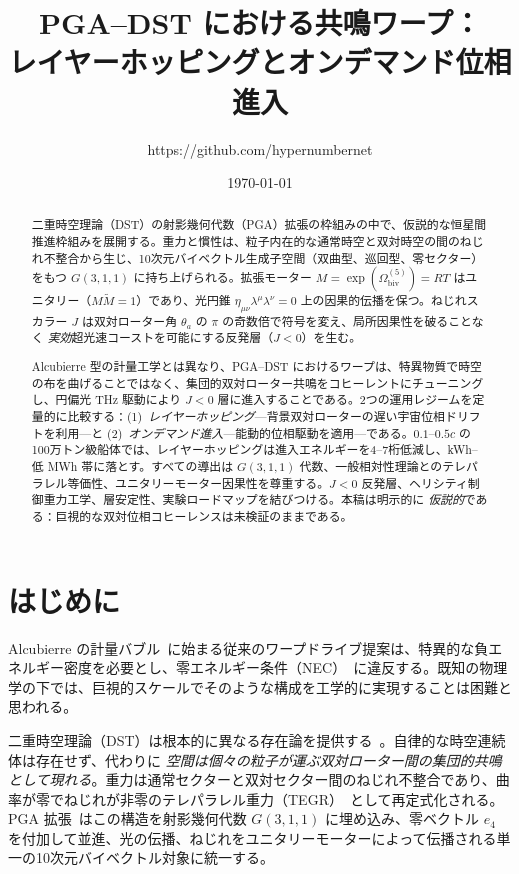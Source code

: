 \documentclass[dvipdfmx,a4paper]{article}
\title{PGA--DST における共鳴ワープ：\\
レイヤーホッピングとオンデマンド位相進入}
\author{https://github.com/hypernumbernet}
\date{\today}
\theoremstyle{definition}
\begin{document}
\maketitle

\begin{abstract}
二重時空理論（DST）の射影幾何代数（PGA）拡張の枠組みの中で、仮説的な恒星間推進枠組みを展開する。重力と慣性は、粒子内在的な通常時空と双対時空の間のねじれ不整合から生じ、10次元バイベクトル生成子空間（双曲型、巡回型、零セクター）をもつ $G(3,1,1)$ に持ち上げられる。拡張モーター $M=\exp(\Omega_{\mathrm{biv}}^{(5)})=RT$ はユニタリー（$M\widetilde{M}=1$）であり、光円錐 $\eta_{\mu\nu}\lambda^\mu\lambda^\nu=0$ 上の因果的伝播を保つ。ねじれスカラー $J$ は双対ローター角 $\theta_a$ の $\pi$ の奇数倍で符号を変え、局所因果性を破ることなく \emph{実効}超光速コーストを可能にする反発層（$J<0$）を生む。

Alcubierre 型の計量工学とは異なり、PGA--DST におけるワープは、特異物質で時空の布を曲げることではなく、集団的双対ローター共鳴をコヒーレントにチューニングし、円偏光 THz 駆動により $J<0$ 層に進入することである。2つの運用レジームを定量的に比較する：(1)~\textit{レイヤーホッピング}---背景双対ローターの遅い宇宙位相ドリフトを利用---と (2)~\textit{オンデマンド進入}---能動的位相駆動を適用---である。$0.1$--$0.5c$ の100万トン級船体では、レイヤーホッピングは進入エネルギーを4--7桁低減し、\si{kWh}--低 \si{MWh} 帯に落とす。すべての導出は $G(3,1,1)$ 代数、一般相対性理論とのテレパラレル等価性、ユニタリーモーター因果性を尊重する。$J<0$ 反発層、ヘリシティ制御重力工学、層安定性、実験ロードマップを結びつける。本稿は明示的に \emph{仮説的}である：巨視的な双対位相コヒーレンスは未検証のままである。
\end{abstract}

\section{はじめに}
\label{sec:intro}

Alcubierre の計量バブル~\cite{alcubierre1994}に始まる従来のワープドライブ提案は、特異的な負エネルギー密度を必要とし、零エネルギー条件（NEC）~\cite{ford2000}に違反する。既知の物理学の下では、巨視的スケールでそのような構成を工学的に実現することは困難と思われる。

二重時空理論（DST）は根本的に異なる存在論を提供する~\cite{dual2025}。自律的な時空連続体は存在せず、代わりに \emph{空間は個々の粒子が運ぶ双対ローター間の集団的共鳴として現れる}。重力は通常セクターと双対セクター間のねじれ不整合であり、曲率が零でねじれが非零のテレパラレル重力（TEGR）~\cite{tegr}として再定式化される。PGA 拡張~\cite{pga2025}はこの構造を射影幾何代数 $G(3,1,1)$ に埋め込み、零ベクトル $e_4$ を付加して並進、光の伝播、ねじれをユニタリーモーターによって伝播される単一の10次元バイベクトル対象に統一する。
\end{document}
